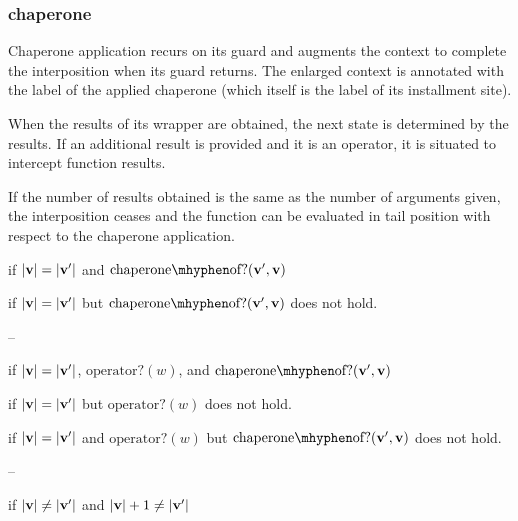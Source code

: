 \documentclass{sigplanconf}
\begin{document}
\subsubsection{chaperone}

Chaperone application recurs on its guard and augments the context to complete the interposition when its guard returns.
The enlarged context is annotated with the label of the applied chaperone (which itself is the label of its installment site).


When the results of its wrapper are obtained, the next state is determined by the results.
If an additional result is provided and it is an operator, it is situated to intercept function results.

If the number of results obtained is the same as the number of arguments given, the interposition ceases and the function can be evaluated in tail position with respect to the chaperone application.

if $|\mathbf{v}|=|\mathbf{v'}|$ and $\mathrm{chaperone\mhyphen of?}(\vvp,\vv)$

if $|\mathbf{v}|=|\mathbf{v'}|$ but $\mathrm{chaperone\mhyphen of?}(\vvp,\vv)$ does not hold.

--

if $|\mathbf{v}|=|\mathbf{v'}|$, $\mathrm{operator?}(w)$, and $\mathrm{chaperone\mhyphen of?}(\vvp,\vv)$

if $|\mathbf{v}|=|\mathbf{v'}|$ but $\mathrm{operator?}(w)$ does not hold.

if $|\mathbf{v}|=|\mathbf{v'}|$ and $\mathrm{operator?}(w)$ but $\mathrm{chaperone\mhyphen of?}(\vvp,\vv)$ does not hold.

--

if $|\mathbf{v}|\ne|\mathbf{v'}|$ and $|\mathbf{v}|+1\ne|\mathbf{v'}|$



\end{document}
